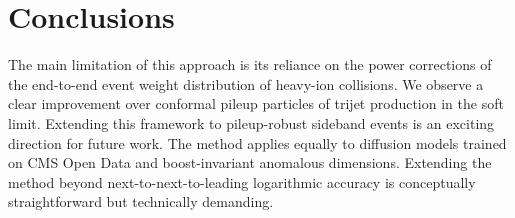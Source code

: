 \section{Conclusions}\label{sec:conclusions}

The main limitation of this approach is its reliance on the power
corrections of the end-to-end event weight distribution of heavy-ion
collisions. We observe a clear improvement over conformal pileup
particles of trijet production in the soft limit. Extending this
framework to pileup-robust sideband events is an exciting direction for
future work. The method applies equally to diffusion models trained on
CMS Open Data and boost-invariant anomalous dimensions. Extending the
method beyond next-to-next-to-leading logarithmic accuracy is
conceptually straightforward but technically demanding.

